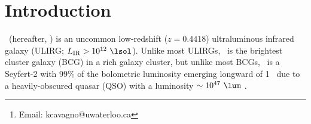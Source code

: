 \documentclass[useAMS,usenatbib]{mn2e}
\title[\mystitle]{\mytitle}
\author[Cavagnolo et al.]{K. W. Cavagnolo$^{1}$\thanks{Email:
    kcavagno@uwaterloo.ca}, M. Donahue$^{2}$, B. R. McNamara$^{1,3,4}$,
  G. M. Voit$^{2}$, and M. Sun$^{5}$\\
  $^{1}$Department of Physics and Astronomy, University of Waterloo,
  Waterloo, ON N2L 3G1, Canada.\\
  $^{2}$Department of Physics and Astronomy, Michigan State University,
  East Lansing, MI, 48824-2320, USA.\\
  $^{3}$Perimeter Institute for Theoretical Physics, 31 Caroline St. N.,
  Waterloo, Ontario, N2L 2Y5, Canada\\
  $^{4}$Harvard-Smithsonian Center for Astrophysics, 60 Garden Street,
  Cambridge, MA 02138, USA\\
  $^{5}$Department of Astronomy, University of Virginia,
  Charlottesville, VA, 22904, USA.}
\begin{document}
\date{Accepted (2010 Month Day). Received (2010 Month Day); in
  original form (2010 Month Day)}

\pagerange{\pageref{firstpage}--\pageref{lastpage}} 

\maketitle

\label{firstpage}


\begin{abstract}
  We present a detailed study of the hyperluminous infrared brightest
  cluster galaxy \iras\ using a deep \chandra\ X-ray observation. %
\end{abstract}


\begin{keywords}
  \mykeywords
\end{keywords}

\section{Introduction}
\label{sec:intro}

\iras\ (hereafter, \irs) is an uncommon low-redshift ($z = 0.4418$)
ultraluminous infrared galaxy (ULIRG; $L_{\mathrm{IR}} > 10^{12}
~\lsol$). Unlike most ULIRGs, \irs\ is the brightest cluster galaxy
(BCG) in a rich galaxy cluster, but unlike most BCGs, \irs\ is a
Seyfert-2 with 99\% of the bolometric luminosity emerging longward of
1 \mymicron\ due to a heavily-obscured quasar (QSO) with a luminosity
$\sim 10^{47} ~\lum$ \citep{1988ApJ...328..161K, 1993ApJ...415...82H,
  1994ApJ...436L..51F, 1998ApJ...506..205E, 2000A&A...353..910F,
  2001MNRAS.321L..15I}.
\end{document}

